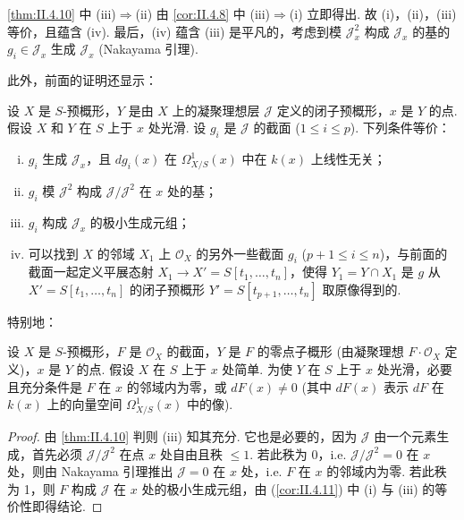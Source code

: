\ref{thm:II.4.10} 中 (iii)$\Rightarrow$(ii) 由 \ref{cor:II.4.8} 中 (iii)$\Rightarrow$(i) 立即得出. 故 (i)，(ii)，(iii) 等价，且蕴含 (iv). 最后，(iv) 蕴含 (iii) 是平凡的，考虑到模 $\mathcal{J}_x^2$ 构成 $\mathcal{J}_x$ 的基的 $g_i \in \mathcal{J}_x$ 生成 $\mathcal{J}_x$ (Nakayama 引理).

此外，前面的证明还显示：

\begin{corollary}\label{cor:II.4.11}
设 $X$ 是 $S$-预概形，$Y$ 是由 $X$ 上的凝聚理想层 $\mathcal{J}$ 定义的闭子预概形，$x$ 是 $Y$ 的点. 假设 $X$ 和 $Y$ 在 $S$ 上于 $x$ 处光滑. 设 $g_i$ 是 $\mathcal{J}$ 的截面 ($1 \leqslant i \leqslant p$). 下列条件等价：
\begin{enumerate}[(i)]
\item $g_i$ 生成 $\mathcal{J}_x$，且 $dg_i(x)$ 在 $\varOmega_{X/S}^{1}(x)$ 中在 $k(x)$ 上线性无关；
\item $g_i$ 模 $\mathcal{J}^2$ 构成 $\mathcal{J}/\mathcal{J}^2$ 在 $x$ 处的基；
\item $g_i$ 构成 $\mathcal{J}_x$ 的极小生成元组；
\item 可以找到 $X$ 的邻域 $X_1$ 上 $\mathcal{O}_X$ 的另外一些截面 $g_i$ ($p+1 \leqslant i \leqslant n$)，与前面的截面一起定义平展态射 $X_1 \to X' = S[t_1, \dots, t_n]$，使得 $Y_1 = Y \cap X_1$ 是 $g$ 从 $X' = S[t_1, \dots, t_n]$ 的闭子预概形 $Y' = S[t_{p+1}, \dots, t_n]$ 取原像得到的.
\end{enumerate}
\end{corollary}

特别地：

\begin{corollary}\label{cor:II.4.12}
设 $X$ 是 $S$-预概形，$F$ 是 $\mathcal{O}_X$ 的截面，$Y$ 是 $F$ 的零点子概形 (由凝聚理想 $F \cdot \mathcal{O}_X$ 定义)，$x$ 是 $Y$ 的点. 假设 $X$ 在 $S$ 上于 $x$ 处简单. 为使 $Y$ 在 $S$ 上于 $x$ 处光滑，必要且充分条件是 $F$ 在 $x$ 的邻域内为零，或 $dF(x) \neq 0$ (其中 $dF(x)$ 表示 $dF$ 在 $k(x)$ 上的向量空间 $\varOmega_{X/S}^{1}(x)$ 中的像).
\end{corollary}

\begin{proof}
由 \ref{thm:II.4.10} 判则 (iii) 知其充分. 它也是必要的，因为 $\mathcal{J}$ 由一个元素生成，首先必须 $\mathcal{J}/\mathcal{J}^2$ 在点 $x$ 处自由且秩 $\leqslant 1$. 若此秩为 0，i.e. $\mathcal{J}/\mathcal{J}^2 = 0$ 在 $x$ 处，则由 Nakayama 引理推出 $\mathcal{J} = 0$ 在 $x$ 处，i.e. $F$ 在 $x$ 的邻域内为零. 若此秩为 1，则 $F$ 构成 $\mathcal{J}$ 在 $x$ 处的极小生成元组，由 (\cref{cor:II.4.11}) 中 (i) 与 (iii) 的等价性即得结论.
\end{proof}

